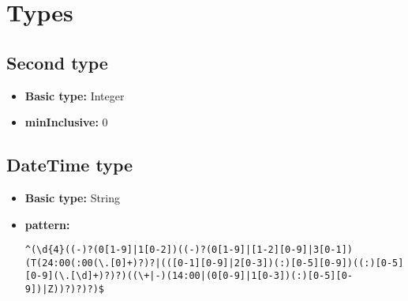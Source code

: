 \documentclass{article}
\begin{document}
\section{Types}
\subsection{Second type}

\begin{itemize}
\item \textbf{Basic type:} Integer
	\item \textbf{minInclusive:} 0
\end{itemize}
\subsection{DateTime type}

\begin{itemize}
\item \textbf{Basic type:} String
	\item \textbf{pattern:} \begin{verbatim}^(\d{4}((-)?(0[1-9]|1[0-2])((-)?(0[1-9]|[1-2][0-9]|3[0-1])(T(24:00(:00(\.[0]+)?)?|(([0-1][0-9]|2[0-3])(:)[0-5][0-9])((:)[0-5][0-9](\.[\d]+)?)?)((\+|-)(14:00|(0[0-9]|1[0-3])(:)[0-5][0-9])|Z))?)?)?)$\end{verbatim}
\end{itemize}
\end{document}
